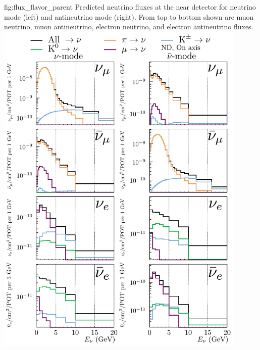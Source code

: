 \begin{dunefigure}{fig:flux_flavor_parent}
{Predicted neutrino fluxes at the near detector for neutrino mode (left) and antineutrino mode (right). From top to bottom shown are muon neutrino, muon antineutrino, electron neutrino, and electron antineutrino fluxes.}
\includegraphics[width=0.9\textwidth]{graphics/ND_HadronParentFluxComponents_0m_offaxis.pdf}
\end{dunefigure}

